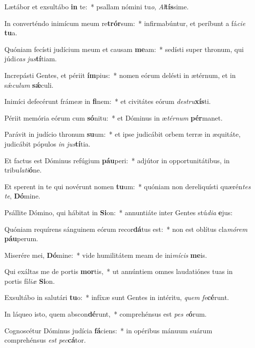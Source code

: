 \item Lætábor et exsultábo \textbf{in} te:~* psallam nómini tu\textit{o}, \textit{Al}\textbf{tís}sime.
\item In converténdo inimícum meum re\textbf{trór}sum:~* infirmabúntur, et períbunt a fá\textit{ci}\textit{e} \textbf{tu}a.
\item Quóniam fecísti judícium meum et causam \textbf{me}am:~* sedísti super thronum, qui júdi\textit{cas} \textit{jus}\textbf{tí}tiam.
\item Increpásti Gentes, et périit \textbf{ím}pius:~* nomen eórum delésti in ætérnum, et in sǽ\textit{cu}\textit{lum} \textbf{sǽ}culi.
\item Inimíci defecérunt frámeæ in \textbf{fi}nem:~* et civitátes eórum \textit{de}\textit{stru}\textbf{xís}ti.
\item Périit memória eórum cum \textbf{só}nitu:~* et Dóminus in æ\textit{tér}\textit{num} \textbf{pér}manet.
\item Parávit in judício thronum \textbf{su}um:~* et ipse judicábit orbem terræ in æquitáte, judicábit pópulos \textit{in} \textit{jus}\textbf{tí}tia.
\item Et factus est Dóminus refúgium \textbf{páu}peri:~* adjútor in opportunitátibus, in tribu\textit{la}\textit{ti}\textbf{ó}ne.
\item Et sperent in te qui novérunt nomen \textbf{tu}um:~* quóniam non dereliquísti quærén\textit{tes} \textit{te}, \textbf{Dó}mine.
\item Psállite Dómino, qui hábitat in \textbf{Si}on:~* annuntiáte inter Gentes stú\textit{di}\textit{a} \textbf{e}jus:
\item Quóniam requírens sánguinem eórum recor\textbf{dá}tus est:~* non est oblítus cla\textit{mó}\textit{rem} \textbf{páu}perum.
\item Miserére mei, \textbf{Dó}mine:~* vide humilitátem meam de ini\textit{mí}\textit{cis} \textbf{me}is.
\item Qui exáltas me de portis \textbf{mor}tis,~* ut annúntiem omnes laudatiónes tuas in portis fí\textit{li}\textit{æ} \textbf{Si}on.
\item Exsultábo in salutári \textbf{tu}o:~* infíxæ sunt Gentes in intéritu, \textit{quem} \textit{fe}\textbf{cé}runt.
\item In láqueo isto, quem abscon\textbf{dé}runt,~* comprehénsus est \textit{pes} \textit{e}\textbf{ó}rum.
\item Cognoscétur Dóminus judícia \textbf{fá}ciens:~* in opéribus mánuum suárum comprehénsus \textit{est} \textit{pec}\textbf{cá}tor.
